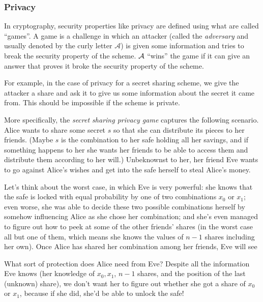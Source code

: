 \subsubsection[Privacy*]{Privacy}

In cryptography, security properties like privacy are defined using what 
are called ``games''. A game is a challenge in which an attacker (called 
the \emph{adversary} and usually denoted by the curly letter $\mathcal{A}$) is given 
some information and tries to break the security property of the scheme. 
$\mathcal{A}$ ``wins'' the game if it can give an answer that proves it broke 
the security property of the scheme. 

For example, in the case of privacy for a secret sharing scheme, we give 
the attacker a share and ask it to give us some information about the 
secret it came from. This should be impossible if the scheme is 
private.

More specifically, the \emph{secret sharing privacy game} captures 
the following scenario. Alice wants to share some secret $s$ so that she
can distribute its pieces to her friends. (Maybe $s$ is the combination to
her safe holding all her savings, and if something happens to her she wants
her friends to be able to access them and distribute them according to
her will.) Unbeknownst to her, her friend Eve wants to go against Alice's
wishes and get into the safe herself to steal Alice's money.

Let's think about the worst case, in which Eve is very powerful: she knows 
that the safe is locked with equal probability by one of two combinations
$x_0$ or $x_1$; even worse, she was able to decide these two possible combinations herself by 
somehow influencing Alice as she chose her combination; and she's
even managed to figure out how to peek at some of the other friends' shares
(in the worst case all but one of them, which means she knows the values of $n-1$ shares including her own).
Once Alice has shared her
combination among her friends, Eve will see 

What sort of protection does Alice need from Eve? Despite all the information 
Eve knows (her knowledge of $x_0, x_1$, $n-1$ shares, and the position of the last (unknown) share), we don't want her to figure
out whether she got a share of $x_0$ or $x_1$, because if she did, she'd
be able to unlock the safe!

